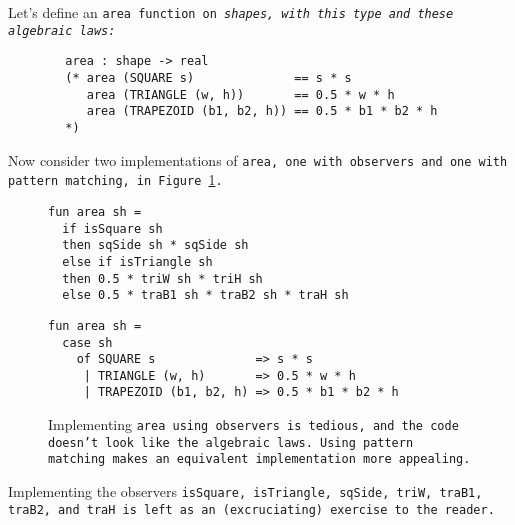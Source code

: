 \documentclass[manuscript,screen,review, 12pt, nonacm]{acmart}
\begin{document}
\begin{outline}[enumerate]
Let's define an \tt{area} function on \it{shape}s, with this type and these
algebraic laws: 

\begin{minipage}[t]{\textwidth}
    \begin{verbatim}
        area : shape -> real 
        (* area (SQUARE s)              == s * s 
           area (TRIANGLE (w, h))       == 0.5 * w * h
           area (TRAPEZOID (b1, b2, h)) == 0.5 * b1 * b2 * h
        *)
\end{verbatim}
\end{minipage}

Now consider two implementations of \tt{area}, one with observers and one with
pattern matching, in Figure~\ref{fig:area}.

    \begin{figure}[H]
      \begin{minipage}[t]{0.7\textwidth}
        \begin{verbatim}
fun area sh =
  if isSquare sh
  then sqSide sh * sqSide sh
  else if isTriangle sh 
  then 0.5 * triW sh * triH sh
  else 0.5 * traB1 sh * traB2 sh * traH sh
            \end{verbatim}
            \label{fig:observerarea} 
      \end{minipage}
      \vfill
      \begin{minipage}[t]{0.7\textwidth}
        \begin{verbatim}
fun area sh =
  case sh 
    of SQUARE s              => s * s
     | TRIANGLE (w, h)       => 0.5 * w * h
     | TRAPEZOID (b1, b2, h) => 0.5 * b1 * b2 * h
                \end{verbatim}
       \vspace{2.2em}
       \label{fig:pmarea}
      \end{minipage}
      \caption{Implementing \tt{area} using observers is tedious, and the code
      doesn't look like the algebraic laws. Using pattern matching makes an
      equivalent implementation more appealing.}
      \label{fig:area}
    \end{figure}

    Implementing the observers \tt{isSquare}, \tt{isTriangle}, \tt{sqSide},
    \tt{triW}, \tt{traB1}, \tt{traB2}, and \tt{traH} is left as an
    (excruciating) exercise to the reader. 
    

\end{outline}
\end{document}
